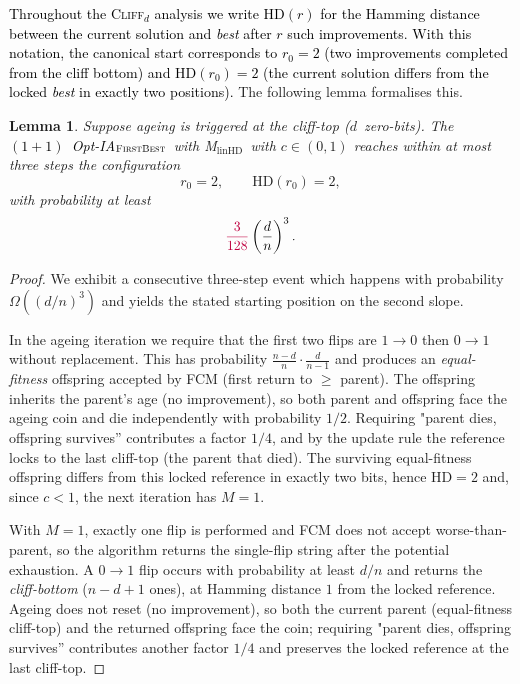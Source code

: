 \documentclass[lettersize,journal]{IEEEtran}
\newcommand{\rerev}[1]{\textcolor{purple}{#1}}
\newcommand{\rev}[1]{\textcolor{black}{#1}}
\newcommand{\HD}{\text{HD}}
\newcommand{\cliff}{\textsc{Cliff}$_d$}
\newcommand{\linHD}{M$_{\text{linHD}}$}
\newcommand{\firstBest}{$(1+1)$~Opt-IA$_{\textsc{FirstBest}}$}
\newtheorem{lemma}{Lemma}
\begin{document}
{\textcolor{black}{Throughout the \cliff{} analysis we write $\mathrm{HD}(r)$ for
the Hamming distance between the current solution and \emph{best} after $r$
such improvements.
With this notation, the canonical start corresponds to
$r_0 = 2$ (two improvements completed from the cliff bottom)
and $\mathrm{HD}(r_0) = 2$ (the current solution differs from the locked
\emph{best} in exactly two positions).}  The following lemma formalises this.

\begin{lemma}\label{lem:can-start-omega-d3}
	Suppose ageing is triggered at the cliff-top ($d$~zero-bits).  
	The \rev{\firstBest}~with \linHD\ with $c\in(0,1)$ reaches within at most three steps the 
	configuration
	\[
	r_0=2, \qquad \mathrm{HD}(r_0)=2,
	\]
	with probability at least 
	\[
	\rerev{\frac{3}{128}}\left(\frac{d}{n}\right)^3.
	\]
\end{lemma}

\begin{proof}
	We exhibit a consecutive three-step event which happens with probability $\Omega((d/n)^3)$ and yields the stated starting 
	position on the second slope.
	
	 In the ageing iteration we require that the first two flips are $1\!\to 0$ then $0\!\to 1$ without replacement. This has probability $\frac{n-d}{n}\cdot\frac{d}{n-1}$ and produces an \emph{equal-fitness} offspring accepted by FCM (first return to $\ge$ parent). The offspring inherits the parent's age (no improvement), so both parent and offspring face the ageing coin and die independently with probability $1/2$. Requiring "parent dies, offspring survives'' contributes a factor $1/4$, and by the update rule the reference locks to the last cliff-top (the parent that died). The surviving equal-fitness offspring differs from this locked reference in exactly two bits, hence $\HD=2$ and, since $c<1$, the next iteration has $M=1$.
		
 With $M=1$, exactly one flip is performed and FCM does not accept worse-than-parent, so the algorithm returns the single-flip string after the potential exhaustion. A $0\!\to 1$ flip occurs with probability at least $d/n$ and returns the \emph{cliff-bottom} ($n-d+1$ ones), at Hamming distance $1$ from the locked reference. Ageing does not reset (no improvement), so both the current parent (equal-fitness cliff-top) and the returned offspring face the coin; requiring "parent dies, offspring survives'' contributes another factor $1/4$ and preserves the locked reference at the last cliff-top.
	

\end{proof}}
\end{document}
